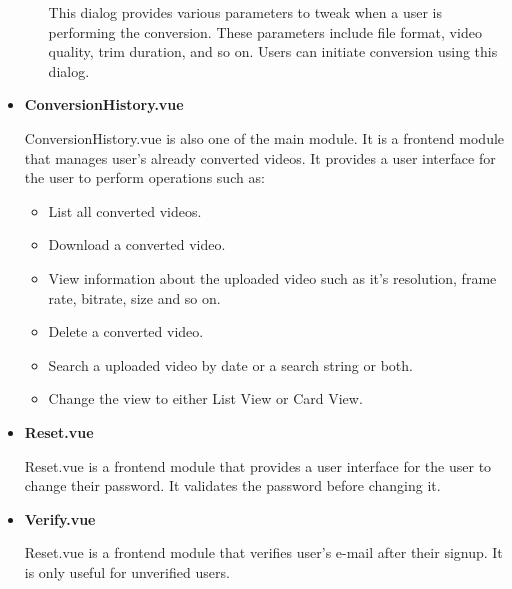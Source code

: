 \begin{itemize}
\begin{itemize}
				\hspace{2cm}
				This dialog provides various parameters to tweak when a user is performing the conversion. These parameters include file format, video quality, trim duration, and so on. Users can initiate conversion using this dialog.
			\end{itemize}
			\vs
			\item
			\large\textbf{ConversionHistory.vue}
			
			\hspace{2cm}
			ConversionHistory.vue is also one of the main module. It is a frontend module that manages user's already converted videos. It provides a user interface for the user to perform operations such as:
			\begin{itemize}
				\item List all converted videos.
				\item Download a converted video.
				\item View information about the uploaded video such as it's resolution, frame rate, bitrate, size and so on.
				\item Delete a converted video.
				\item Search a uploaded video by date or a search string or both.
				\item Change the view to either List View or Card View.
			\end{itemize}
			\vs
			\item
			\large\textbf{Reset.vue}
			
			\hspace{2cm}
			Reset.vue is a frontend module that provides a user interface for the user to change their password.  It validates the password before changing it.
			\vs
			\item
			\large\textbf{Verify.vue}
			
			\hspace{2cm}
			Reset.vue is a frontend module that verifies user's e-mail after their signup. It is only useful for unverified users.
		\end{itemize}